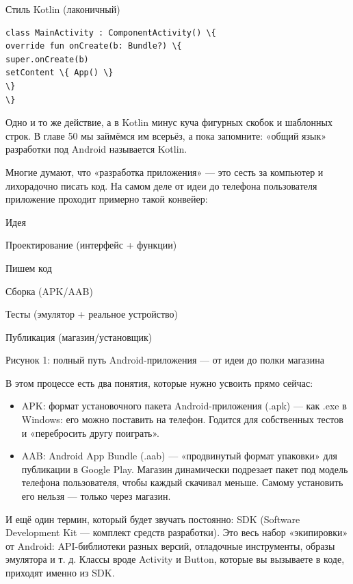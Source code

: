 Стиль Kotlin (лаконичный)

\begin{lstlisting}
class MainActivity : ComponentActivity() \{
override fun onCreate(b: Bundle?) \{
super.onCreate(b)
setContent \{ App() \}
\}
\}
\end{lstlisting}

Одно и то же действие, а в Kotlin минус куча фигурных скобок и шаблонных строк. В главе 50 мы займёмся им всерьёз, а пока запомните: «общий язык» разработки под Android называется Kotlin.


Многие думают, что «разработка приложения» — это сесть за компьютер и лихорадочно писать код. На самом деле от идеи до телефона пользователя приложение проходит примерно такой конвейер:

Идея

Проектирование (интерфейс + функции)

Пишем код

Сборка (APK/AAB)

Тесты (эмулятор + реальное устройство)

Публикация (магазин/установщик)

\begin{center}\small\color{gray}Рисунок 1: полный путь Android-приложения — от идеи до полки магазина\end{center}

В этом процессе есть два понятия, которые нужно усвоить прямо сейчас:

\begin{itemize}
  \item APK: формат установочного пакета Android-приложения (.apk) — как .exe в Windows: его можно поставить на телефон. Годится для собственных тестов и «перебросить другу поиграть».
  \item AAB: Android App Bundle (.aab) — «продвинутый формат упаковки» для публикации в Google Play. Магазин динамически подрезает пакет под модель телефона пользователя, чтобы каждый скачивал меньше. Самому установить его нельзя — только через магазин.
\end{itemize}

И ещё один термин, который будет звучать постоянно: SDK (Software Development Kit — комплект средств разработки). Это весь набор «экипировки» от Android: API-библиотеки разных версий, отладочные инструменты, образы эмулятора и т. д. Классы вроде Activity и Button, которые вы вызываете в коде, приходят именно из SDK.

